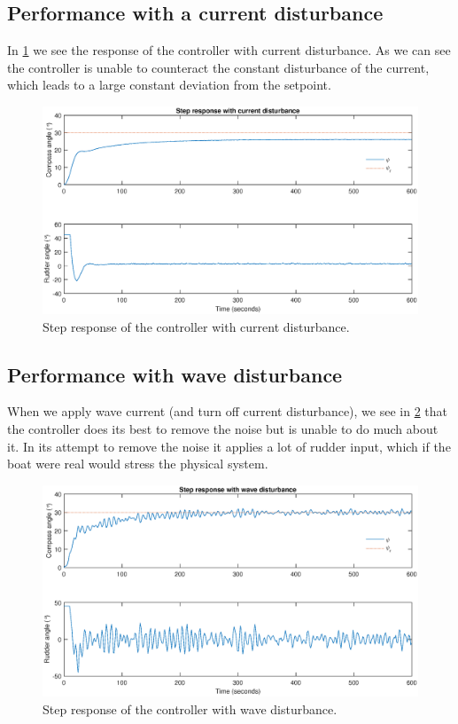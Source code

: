 \subsection{Performance with a current disturbance}

In \cref{fig:step_current_dist} we see the response of the controller with current disturbance. As we can see the controller is unable to counteract the constant disturbance of the current, which leads to a large constant deviation from the setpoint.

\begin{figure}
    \centering
    \includegraphics[width=\textwidth]{images/oppg3/stepresp_current_disturbance.eps}
    \caption{Step response of the controller with current disturbance.}
    \label{fig:step_current_dist}
\end{figure}

\subsection{Performance with wave disturbance}

When we apply wave current (and turn off current disturbance), we see in \cref{fig:step_wave_dist} that the controller does its best to remove the noise but is unable to do much about it. In its attempt to remove the noise it applies a lot of rudder input, which if the boat were real would stress the physical system.

\begin{figure}[H]
    \centering
    \includegraphics[width=\textwidth]{images/oppg3/stepresp_wave_disturbance.eps}
    \caption{Step response of the controller with wave disturbance.}
    \label{fig:step_wave_dist}
\end{figure}
